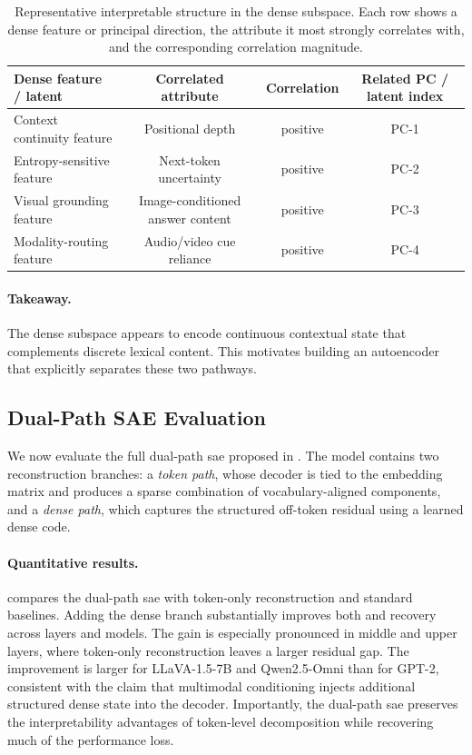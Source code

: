 \documentclass{article}
\begin{document}
\begin{table}[t]
  \centering
  \small
  \begin{tabular}{lccc}
    \toprule
    Dense feature / latent & Correlated attribute & Correlation & Related PC / latent index \\
    \midrule
    Context continuity feature & Positional depth & positive & PC-1 \\
    Entropy-sensitive feature & Next-token uncertainty & positive & PC-2 \\
    Visual grounding feature & Image-conditioned answer content & positive & PC-3 \\
    Modality-routing feature & Audio/video cue reliance & positive & PC-4 \\
    \bottomrule
  \end{tabular}
  \caption{
    Representative interpretable structure in the dense subspace.
    Each row shows a dense feature or principal direction, the attribute it most strongly correlates with, and the corresponding correlation magnitude.
  }
  \label{tab:dense_features}
\end{table}

\paragraph{Takeaway.}
The dense subspace appears to encode continuous contextual state that complements discrete lexical content.
This motivates building an autoencoder that explicitly separates these two pathways.

\subsection{Dual-Path SAE Evaluation}
\label{subsec:dualpath_sae}

We now evaluate the full dual-path \gls{sae} proposed in .
The model contains two reconstruction branches:
a \emph{token path}, whose decoder is tied to the embedding matrix and produces a sparse combination of vocabulary-aligned components, and a \emph{dense path}, which captures the structured off-token residual using a learned dense code.

\paragraph{Quantitative results.}
 compares the dual-path \gls{sae} with token-only reconstruction and standard  baselines.
Adding the dense branch substantially improves both  and  recovery across layers and models.
The gain is especially pronounced in middle and upper layers, where token-only reconstruction leaves a larger residual gap. The improvement is larger for LLaVA-1.5-7B and Qwen2.5-Omni than for GPT-2, consistent with the claim that multimodal conditioning injects additional structured dense state into the decoder.
Importantly, the dual-path \gls{sae} preserves the interpretability advantages of token-level decomposition while recovering much of the performance loss.
\end{document}

